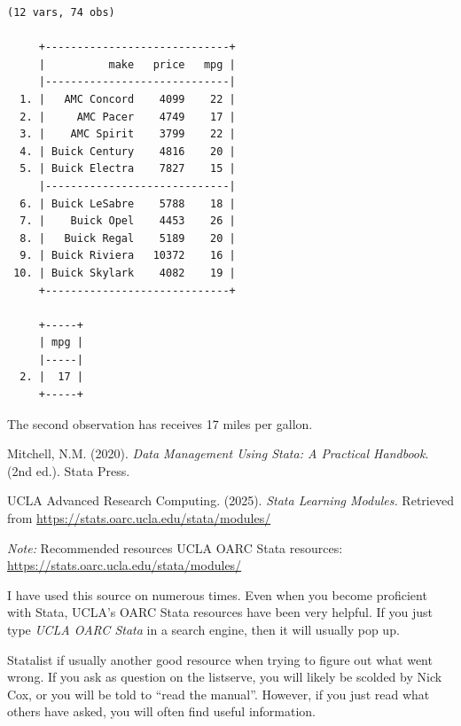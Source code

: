\documentclass[
]{book}
\begin{document}
\begin{verbatim}
(12 vars, 74 obs)

     +-----------------------------+
     |          make   price   mpg |
     |-----------------------------|
  1. |   AMC Concord    4099    22 |
  2. |     AMC Pacer    4749    17 |
  3. |    AMC Spirit    3799    22 |
  4. | Buick Century    4816    20 |
  5. | Buick Electra    7827    15 |
     |-----------------------------|
  6. | Buick LeSabre    5788    18 |
  7. |    Buick Opel    4453    26 |
  8. |   Buick Regal    5189    20 |
  9. | Buick Riviera   10372    16 |
 10. | Buick Skylark    4082    19 |
     +-----------------------------+

     +-----+
     | mpg |
     |-----|
  2. |  17 |
     +-----+
\end{verbatim}

The second observation has receives 17 miles per gallon.

Mitchell, N.M. (2020). \emph{Data Management Using Stata: A Practical Handbook}. (2nd ed.). Stata Press.

UCLA Advanced Research Computing. (2025). \emph{Stata Learning Modules.} Retrieved from \url{https://stats.oarc.ucla.edu/stata/modules/}

\emph{Note: }Recommended resources
UCLA OARC Stata resources: \url{https://stats.oarc.ucla.edu/stata/modules/}

I have used this source on numerous times. Even when you become proficient with Stata, UCLA's OARC Stata resources have been very helpful. If you just type \emph{UCLA OARC Stata } in a search engine, then it will usually pop up.

Statalist if usually another good resource when trying to figure out what went wrong. If you ask as question on the listserve, you will likely be scolded by Nick Cox, or you will be told to ``read the manual''. However, if you just read what others have asked, you will often find useful information.


\end{document}
